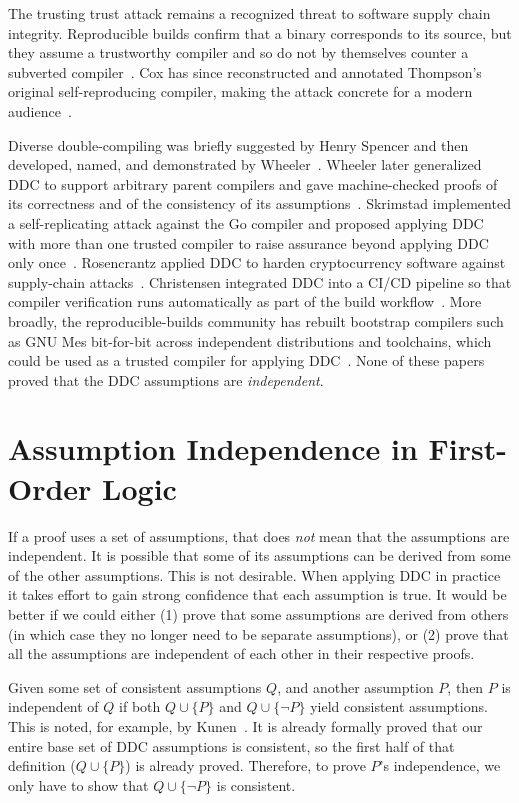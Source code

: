 The trusting trust attack remains a recognized threat to software supply chain integrity. Reproducible builds confirm that a binary corresponds to its source, but they assume a trustworthy compiler and so do not by themselves counter a subverted compiler~\cite{lamb2022reproducible}. Cox has since reconstructed and annotated Thompson's original self-re\-pro\-duc\-ing compiler, making the attack concrete for a modern audience~\cite{cox2023nih}.

Diverse double-compiling was briefly suggested by Henry Spencer and then developed, named, and demonstrated by Wheeler~\cite{wheeler2005ddc}. Wheeler later generalized DDC to support arbitrary parent compilers and gave machine-checked proofs of its correctness and of the consistency of its assumptions~\cite{wheeler2010ddc}. Skrimstad implemented a self-rep\-li\-cat\-ing attack against the Go compiler and proposed applying DDC with more than one trusted compiler to raise assurance beyond applying DDC only once~\cite{skrimstad2018ddc}. Rosencrantz applied DDC to harden cryptocurrency software against supply-chain attacks~\cite{rosencrantz2023ddc}. Christensen integrated DDC into a CI/CD pipeline so that compiler verification runs automatically as part of the build workflow~\cite{christensen2025ddc}. More broadly, the re\-pro\-duc\-ible-builds community has rebuilt bootstrap compilers such as GNU Mes bit-for-bit across independent distributions and toolchains, which could be used as a trusted compiler for applying DDC~\cite{mesbootstrap2019}. None of these papers proved that the DDC assumptions are \emph{independent}.

\section{Assumption Independence in First-Order Logic}

If a proof uses a set of assumptions, that does \emph{not} mean that the assumptions are independent. It is possible that some of its assumptions can be derived from some of the other assumptions. This is not desirable. When applying DDC in practice it takes effort to gain strong confidence that each assumption is true. It would be better if we could either (1) prove that some assumptions are derived from others (in which case they no longer need to be separate assumptions), or (2) prove that all the assumptions are independent of each other in their respective proofs.

Given some set of consistent assumptions $Q$, and another assumption $P$, then $P$ is independent of $Q$ if both $Q \cup \{P\}$ and $Q \cup \{\neg P\}$ yield consistent assumptions. This is noted, for example, by Kunen~\cite[page xi]{kunen1980set}. It is already formally proved that our entire base set of DDC assumptions is consistent, so the first half of that definition ($Q \cup \{P\}$) is already proved. Therefore, to prove $P$'s independence, we only have to show that $Q \cup \{\neg P\}$ is consistent.

